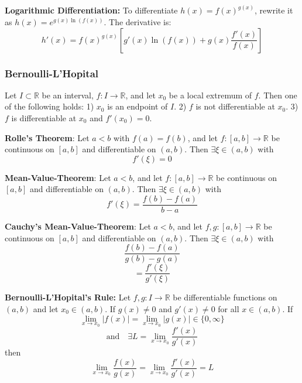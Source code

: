 \begin{theorem}
    \textbf{Logarithmic Differentiation:} To differentiate $h(x) = f(x)^{g(x)}$, rewrite it as $h(x) = e^{g(x) \ln(f(x))}$. The derivative is:
    $$h'(x) = f(x)^{g(x)} \left[ g'(x)\ln(f(x)) + g(x)\frac{f'(x)}{f(x)} \right]$$
\end{theorem}

\subsubsection{Bernoulli-L'Hopital}

\begin{theorem}
    Let $I \subset \mathbb{R}$ be an interval, $f: I \to \mathbb{R}$, and let $x_0$ be a local extremum of $f$. Then one of the following holds:
    1) $x_0$ is an endpoint of $I$. 
    2) $f$ is not differentiable at $x_0$. 
    3) $f$ is differentiable at $x_0$ and $f'(x_0) = 0$.
\end{theorem}

\begin{theorem}
    \textbf{Rolle's Theorem}: Let $a \lt b$ with $f(a) = f(b)$, and let $f:[a, b] \to \mathbb{R}$ be continuous on $[a, b]$ and differentiable on $(a, b)$. Then $\exists \xi \in (a, b)$ with
    $$f'(\xi) = 0$$
\end{theorem}

\begin{theorem}
    \textbf{Mean-Value-Theorem}: Let $a \lt b$, and let $f:[a, b] \to \mathbb{R}$ be continuous on $[a, b]$ and differentiable on $(a, b)$. Then $\exists \xi \in (a, b)$ with
    $$f'(\xi) = \frac{f(b)-f(a)}{b-a}$$
\end{theorem}

\begin{theorem}
    \textbf{Cauchy's Mean-Value-Theorem}: Let $a \lt b$, and let $f, g:[a, b] \to \mathbb{R}$ be continuous on $[a, b]$ and differentiable on $(a, b)$. Then $\exists \xi \in (a, b)$ with
    $$\frac{f(b)-f(a)}{g(b)-g(a)}$$
    $$= \frac{f'(\xi)}{g'(\xi)}$$
\end{theorem}

\begin{theorem}
    \textbf{Bernoulli-L'Hopital's Rule:} Let $f, g: I \to \mathbb{R}$ be differentiable functions on $(a, b)$ and let $x_0 \in (a, b)$. If $g(x) \neq 0$ and $g'(x) \neq 0$ for all $x \in (a, b)$. If
    $$\lim_{x \to x_0} |f(x)| = \lim_{x \to x_0} |g(x)| \in \{ 0, \infty \}$$
    $$\text{and} \quad \exists L = \lim_{x \to x_0} \frac{f'(x)}{g'(x)}$$
    then
    $$\lim_{x \to x_0} \frac{f(x)}{g(x)} = \lim_{x \to x_0} \frac{f'(x)}{g'(x)} = L$$
\end{theorem}

